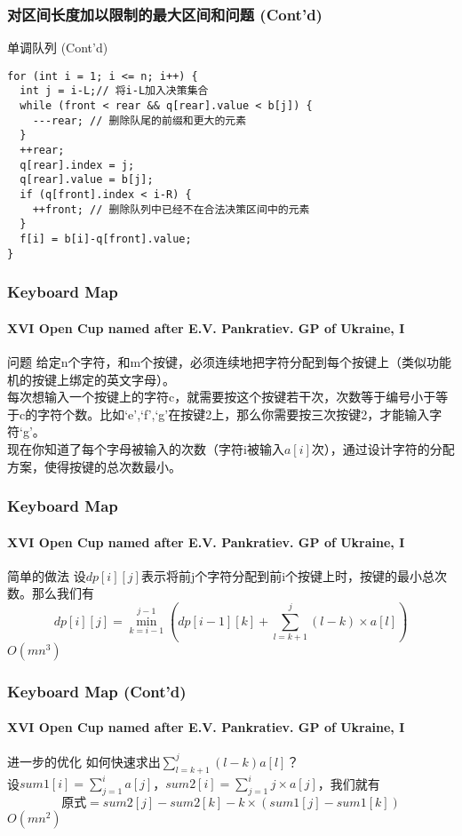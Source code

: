 \documentclass[hyperref={unicode=true}]{beamer}
\theoremstyle{definition}
\theoremstyle{proof}
\begin{document}
\begin{frame}[fragile]\frametitle{对区间长度加以限制的最大区间和问题 (Cont'd)}
  \begin{exampleblock}{单调队列 (Cont'd)}
    \begin{verbatim}
for (int i = 1; i <= n; i++) {
  int j = i-L;// 将i-L加入决策集合
  while (front < rear && q[rear].value < b[j]) {
    ---rear; // 删除队尾的前缀和更大的元素
  }
  ++rear;
  q[rear].index = j;
  q[rear].value = b[j];
  if (q[front].index < i-R) {
    ++front; // 删除队列中已经不在合法决策区间中的元素
  }
  f[i] = b[i]-q[front].value;
}
    \end{verbatim}
  \end{exampleblock}
\end{frame}

\begin{frame}\frametitle{Keyboard Map}
  \framesubtitle{XVI Open Cup named after E.V. Pankratiev. GP of Ukraine, I}
  \begin{block}{问题}
    给定n个字符，和m个按键，必须连续地把字符分配到每个按键上（类似功能机的按键上绑定的英文字母）。\\
    每次想输入一个按键上的字符c，就需要按这个按键若干次，次数等于编号小于等于c的字符个数。比如`e',`f',`g'在按键2上，那么你需要按三次按键2，才能输入字符`g'。\\
    现在你知道了每个字母被输入的次数（字符i被输入$a[i]$次），通过设计字符的分配方案，使得按键的总次数最小。
  \end{block}
\end{frame}

\begin{frame}\frametitle{Keyboard Map}
  \framesubtitle{XVI Open Cup named after E.V. Pankratiev. GP of Ukraine, I}
  \begin{alertblock}{简单的做法}
    设$dp[i][j]$表示将前j个字符分配到前i个按键上时，按键的最小总次数。那么我们有
    \[dp[i][j] = \min_{k=i-1}^{j-1}{(dp[i-1][k] + \sum_{l=k+1}^{j}(l-k)\times a[l])}\]
    $O(mn^3)$
  \end{alertblock}
\end{frame}

\begin{frame}\frametitle{Keyboard Map (Cont'd)}
  \framesubtitle{XVI Open Cup named after E.V. Pankratiev. GP of Ukraine, I}
  \begin{alertblock}{进一步的优化}
    如何快速求出$\sum_{l=k+1}^{j}(l-k)a[l]$？\\
    \pause{}设$sum1[i] = \sum_{j=1}^i a[j]$，$sum2[i] = \sum_{j=1}^ij\times a[j]$，我们就有
    \[\text{原式}=sum2[j]-sum2[k]-k \times (sum1[j]-sum1[k])\]
    $O(mn^2)$
  \end{alertblock}
\end{frame}
\end{document}
